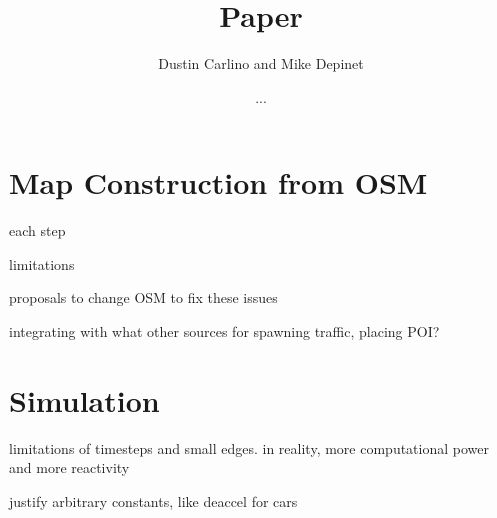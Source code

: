 \documentclass[12pt]{article}
\title{Paper}
\author{Dustin Carlino and Mike Depinet}
\date{...}
\begin{document}
\maketitle



\section{Map Construction from OSM}

each step

limitations

proposals to change OSM to fix these issues

integrating with what other sources for spawning traffic, placing POI?


\section{Simulation}

limitations of timesteps and small edges. in reality, more computational power
and more reactivity

justify arbitrary constants, like deaccel for cars
\end{document}
